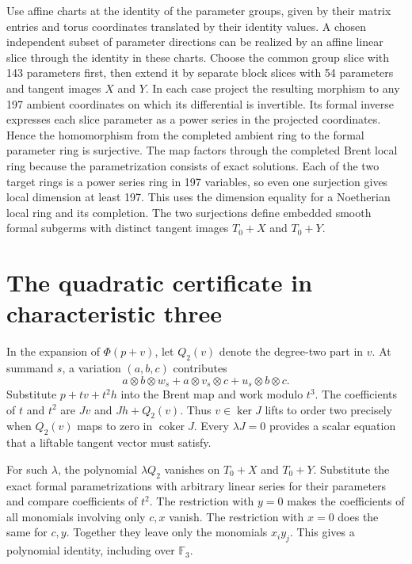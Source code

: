 \documentclass[11pt]{amsart}
\newcommand{\F}{\mathbb F}
\begin{document}
Use affine charts at the identity of the parameter groups, given by
their matrix entries and torus coordinates translated by their
identity values. A chosen independent subset of parameter directions
can be realized by an affine linear slice through the identity in
these charts. Choose the common group slice with 143 parameters
first, then extend it by separate block slices with 54 parameters
and tangent images $X$ and $Y$.
In each case project the resulting morphism to any 197 ambient
coordinates on which its differential is invertible. Its formal
inverse expresses each slice parameter as a power series in the
projected coordinates. Hence the homomorphism from the completed
ambient ring to the formal parameter ring is surjective.
The map factors through the completed Brent local ring because
the parametrization consists of exact solutions. Each of the two
target rings is a power series ring in 197 variables, so even one
surjection gives local dimension at least 197. This uses the
dimension equality for a Noetherian local ring and its completion.
The two surjections define embedded smooth formal subgerms with
distinct tangent images $T_0+X$ and $T_0+Y$.

\section{The quadratic certificate in characteristic three}\label{sec:quadratics}

In the expansion of $\Phi(p+v)$, let $Q_2(v)$ denote the degree-two
part in $v$. At summand $s$, a variation $(a,b,c)$ contributes
\[
 a\otimes b\otimes w_s + a\otimes v_s\otimes c
  +u_s\otimes b\otimes c .
\]
Substitute $p+tv+t^2h$ into the Brent map and work modulo $t^3$.
The coefficients of $t$ and $t^2$ are $Jv$ and $Jh+Q_2(v)$.
Thus $v\in\ker J$ lifts to order two precisely when $Q_2(v)$ maps to
zero in $\operatorname{coker}J$. Every $\lambda J=0$ provides a
scalar equation that a liftable tangent vector must satisfy.

For such $\lambda$, the polynomial $\lambda Q_2$ vanishes on
$T_0+X$ and $T_0+Y$. Substitute the exact formal parametrizations
with arbitrary linear series for their parameters and compare
coefficients of $t^2$. The restriction with $y=0$ makes the
coefficients of all monomials involving only $c,x$ vanish. The
restriction with $x=0$ does the same for $c,y$. Together they leave
only the monomials $x_i y_j$. This gives a polynomial identity,
including over $\F_3$.
\end{document}
